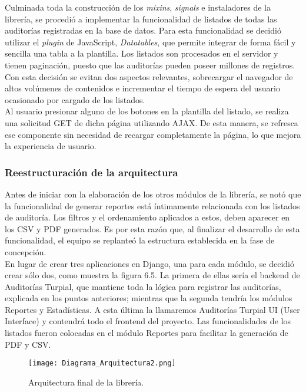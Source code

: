 Culminada toda la construcción de los \textit{mixins}, \textit{signals} e instaladores de la librería, se procedió a implementar la funcionalidad de listados de todas las auditorías registradas en la base de datos. Para esta funcionalidad se decidió utilizar el \textit{plugin} de JavaScript, \textit{Datatables}, que permite integrar de forma fácil y sencilla una tabla a la plantilla. Los listados son procesados en el servidor y tienen paginación, puesto que las auditorías pueden poseer millones de registros. Con esta decisión se evitan dos aspectos relevantes, sobrecargar el navegador de altos volúmenes de contenidos e incrementar el tiempo de espera del usuario ocasionado por cargado de los listados.\\

Al usuario presionar alguno de los botones en la plantilla del listado, se realiza una solicitud GET de dicha página utilizando AJAX. De esta manera, se refresca ese componente sin necesidad de recargar completamente la página, lo que mejora la experiencia de usuario.

\subsubsection{Reestructuración de la arquitectura}

Antes de iniciar con la elaboración de los otros módulos de la librería, se notó que la funcionalidad de generar reportes está íntimamente relacionada con los listados de auditoría. Los filtros y el ordenamiento aplicados a estos, deben aparecer en los CSV y PDF generados. Es por esta razón que, al finalizar el desarrollo de esta funcionalidad, el equipo se replanteó la estructura establecida en la fase de concepción.\\

En lugar de crear tres aplicaciones en Django, una para cada módulo, se decidió crear sólo dos, como muestra la figura 6.5. La primera de ellas sería el backend de Auditorías Turpial, que mantiene toda la lógica para registrar las auditorías, explicada en los puntos anteriores; mientras que la segunda tendría los módulos Reportes y Estadísticas. A esta última  la llamaremos Auditorías Turpial UI (User Interface) y contendrá todo el frontend del proyecto. Las funcionalidades de los listados fueron colocadas en el módulo Reportes para facilitar la generación de PDF y CSV.

\begin{figure}[h]
\centering
\texttt{[image: Diagrama\_Arquitectura2.png]}
\caption{Arquitectura final de la librería.}
\label{fig:figura6.5}
\end{figure}

